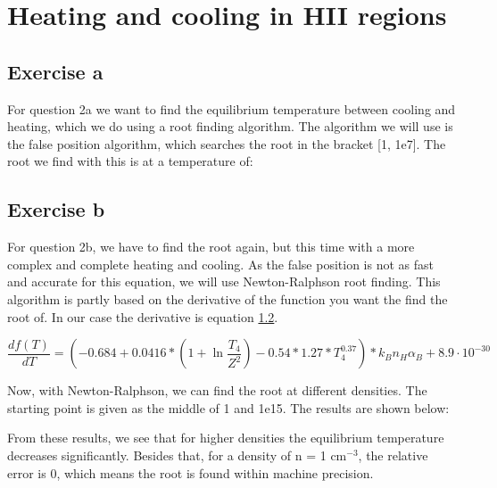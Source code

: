 \section{Heating and cooling in HII regions}

\subsection{Exercise a}

For question 2a we want to find the equilibrium temperature between cooling and heating, which we do using a root finding algorithm. The algorithm we will use is the false position algorithm, which searches the root in the bracket [1, 1e7]. The root we find with this is at a temperature of:



\subsection{Exercise b}

For question 2b, we have to find the root again, but this time with a more complex and complete heating and cooling. As the false position is not as fast and accurate for this equation, we will use Newton-Ralphson root finding. This algorithm is partly based on the derivative of the function you want the find the root of. In our case the derivative is equation \ref{}.

\begin{equation}
    \frac{df(T)}{dT} = (-0.684 + 0.0416 * (1 + \ln{\frac{T_4}{Z^2}} ) - 0.54 * 1.27 * T_4^{0.37}) * k_B n_H \alpha_B + 8.9\cdot10^{-30}
\end{equation}

Now, with Newton-Ralphson, we can find the root at different densities. The starting point is given as the middle of 1 and 1e15. The results are shown below:



From these results, we see that for higher densities the equilibrium temperature decreases significantly. Besides that, for a density of n = 1 $\mathrm{cm^{-3}}$, the relative error is 0, which means the root is found within machine precision. 

